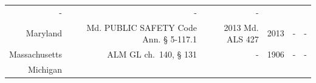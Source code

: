 \documentclass[]{article}
\begin{document}
\begin{longtable}[c]{@{}rrrrrr@{}}
\begin{minipage}[t]{0.10\columnwidth}
-
\strut\end{minipage} &
\begin{minipage}[t]{0.10\columnwidth}\raggedleft\strut
-
\strut\end{minipage} &
\begin{minipage}[t]{0.10\columnwidth}\raggedleft\strut
-
\strut\end{minipage}\tabularnewline
\begin{minipage}[t]{0.10\columnwidth}\raggedleft\strut
Maryland
\strut\end{minipage} &
\begin{minipage}[t]{0.21\columnwidth}\raggedleft\strut
Md. PUBLIC SAFETY Code Ann. § 5-117.1
\strut\end{minipage} &
\begin{minipage}[t]{0.22\columnwidth}\raggedleft\strut
2013 Md. ALS 427
\strut\end{minipage} &
\begin{minipage}[t]{0.10\columnwidth}\raggedleft\strut
2013
\strut\end{minipage} &
\begin{minipage}[t]{0.10\columnwidth}\raggedleft\strut
-
\strut\end{minipage} &
\begin{minipage}[t]{0.10\columnwidth}\raggedleft\strut
-
\strut\end{minipage}\tabularnewline
\begin{minipage}[t]{0.10\columnwidth}\raggedleft\strut
Massachusetts
\strut\end{minipage} &
\begin{minipage}[t]{0.21\columnwidth}\raggedleft\strut
ALM GL ch.~140, § 131
\strut\end{minipage} &
\begin{minipage}[t]{0.22\columnwidth}\raggedleft\strut
-
\strut\end{minipage} &
\begin{minipage}[t]{0.10\columnwidth}\raggedleft\strut
1906
\strut\end{minipage} &
\begin{minipage}[t]{0.10\columnwidth}\raggedleft\strut
-
\strut\end{minipage} &
\begin{minipage}[t]{0.10\columnwidth}\raggedleft\strut
-
\strut\end{minipage}\tabularnewline
\begin{minipage}[t]{0.10\columnwidth}\raggedleft\strut
Michigan
\strut\end{minipage} &

\end{longtable}
\end{document}
